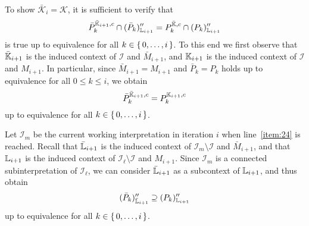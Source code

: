 \begin{Proof}
  To show $\bar{\mathcal{K}}_{i} = \mathcal{K}$, it is sufficient to verify that
  \begin{equation}
    \label{eq:56}
    \bar P_{k}^{\bar{{\mathbb{K}}}_{i+1}, c} \cap (\bar P_{k})_{{\mathbb{L}}_{i+1}}'' =
    P_{k}^{\bar{{\mathbb{K}}}, c} \cap (P_{k})_{{\mathbb{L}}_{i+1}}''
  \end{equation}
  is true up to equivalence for all $k \in {\ensuremath{\{\, 0, \dots, i \,\}}}$.  To this end we first
  observe that $\bar{{\mathbb{K}}}_{i+1}$ is the induced context of $\mathcal{I}$ and $\bar
  M_{i+1}$, and ${\mathbb{K}}_{i+1}$ is the induced context of $\mathcal{I}$ and $M_{i+1}$.  In
  particular, since $\bar M_{i+1} = M_{i+1}$ and $\bar P_{k} = P_{k}$ holds up to
  equivalence for all $0 \leq k \leq i$, we obtain
  \begin{equation*}
    \bar P_{k}^{\bar{{\mathbb{K}}}_{i+1}, c} = P_{k}^{{\mathbb{K}}_{i+1}, c}
  \end{equation*}
  up to equivalence for all $k \in {\ensuremath{\{\, 0, \dots, i \,\}}}$.

  Let $\mathcal{I}_{m}$ be the current working interpretation in iteration $i$ when
  line~\ref{item:24} is reached.  Recall that $\bar{{\mathbb{L}}}_{i+1}$ is the induced context
  of $\mathcal{I}_{m} \setminus \mathcal{I}$ and $\bar M_{i+1}$, and that ${\mathbb{L}}_{i+1}$
  is the induced context of $\mathcal{I}_{\ell} \setminus \mathcal{I}$ and $M_{i+1}$.
  Since $\mathcal{I}_{m}$ is a connected subinterpretation of $\mathcal{I}_{\ell}$, we can
  consider $\bar{{\mathbb{L}}}_{i+1}$ as a subcontext of ${\mathbb{L}}_{i+1}$, and thus obtain
  \begin{equation*}
    (\bar P_{k})_{\bar{{\mathbb{L}}}_{i+1}}'' \supseteq (P_{k})_{{\mathbb{L}}_{i+1}}''
  \end{equation*}
  up to equivalence for all $k \in {\ensuremath{\{\, 0, \dots, i \,\}}}$.


\end{Proof}
